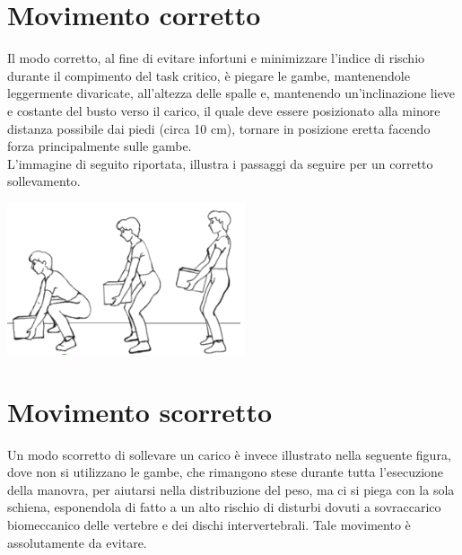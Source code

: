 \documentclass[a4paper, oneside]{book}
\begin{document}
	\section{Movimento corretto}
Il modo corretto, al fine di evitare infortuni e minimizzare l'indice di rischio durante il compimento del task critico, è piegare le gambe, mantenendole leggermente divaricate, all'altezza delle spalle e, mantenendo un’inclinazione lieve e costante del busto verso il carico, il quale deve essere posizionato alla minore distanza possibile dai piedi (circa 10 cm), tornare in posizione eretta facendo forza principalmente sulle gambe. \\ L'immagine di seguito riportata, illustra i passaggi da seguire per un corretto sollevamento.\\

\vspace{2mm}
\begin{center}
\begin{minipage}{0.48\linewidth}
\begin{center}
\includegraphics[width=70mm,scale=0.7]{./images/sollevamento_corretto.png} 
\vspace{3mm}
\end{center}
\end{minipage}
\end{center}
\vspace{5mm}

\section{Movimento scorretto}
	Un modo scorretto di sollevare un carico è invece illustrato nella seguente figura, dove non si utilizzano le gambe, che rimangono stese durante tutta l'esecuzione della manovra, per aiutarsi nella distribuzione del peso, ma ci si piega con la sola schiena, esponendola di fatto a un alto rischio di disturbi dovuti a sovraccarico biomeccanico delle vertebre e dei dischi intervertebrali. Tale movimento è assolutamente da evitare. \\
\end{document}
